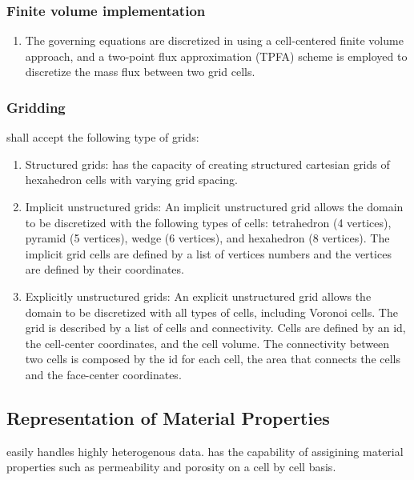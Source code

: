 \subsubsection{Finite volume implementation}
\begin{enumerate}[resume]
	\item The governing equations are discretized in \pft using a cell-centered finite volume approach, and a two-point flux approximation (TPFA) scheme is employed to discretize the mass flux between two grid cells. \label{FVmethod} 
\end{enumerate}

\subsubsection{Gridding}
\pft shall accept the following type of grids:
\begin{enumerate}[resume]
	\item Structured grids:  \label{structGrid} \pft has the capacity of creating structured cartesian grids of hexahedron cells with varying grid spacing.
	\item Implicit unstructured grids: \label{impStructGrid} An implicit unstructured grid allows the domain to be discretized with the following types of cells: tetrahedron (4 vertices), pyramid (5 vertices), wedge (6 vertices), and hexahedron (8 vertices). The implicit grid cells are defined by a list of vertices numbers and the vertices are defined by their coordinates.
	\item Explicitly unstructured grids: \label{expStructGrid} An explicit unstructured grid allows the domain to be discretized with all types of cells, including Voronoi cells. The grid is described by a list of cells and connectivity. Cells are defined by an id, the cell-center coordinates, and the cell volume. The connectivity between two cells is composed by the id for each cell, the area that connects the cells and the face-center coordinates.
\end{enumerate}



\subsection{Representation of Material Properties}
\pft easily handles highly heterogenous data. \pft has the capability of assigining material properties such as permeability and porosity on a cell by cell basis.

